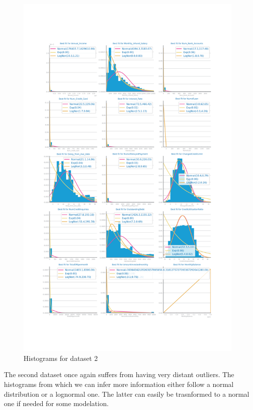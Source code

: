 \documentclass[10pt]{extarticle}
\begin{document}
\begin{figure}[H]
\centering\includegraphics[scale=0.4]{images/dataset2/data_profiling/Credit_Score_histogram_numeric_distribution.png}
\caption{Histograms for dataset 2} %
\end{figure}
The second dataset once again suffers from having very distant outliers. The histograms from which we can infer more information
either follow a normal distribution or a lognormal one. The latter can easily be trasnformed to a normal one if needed for some modelation.
\end{document}
